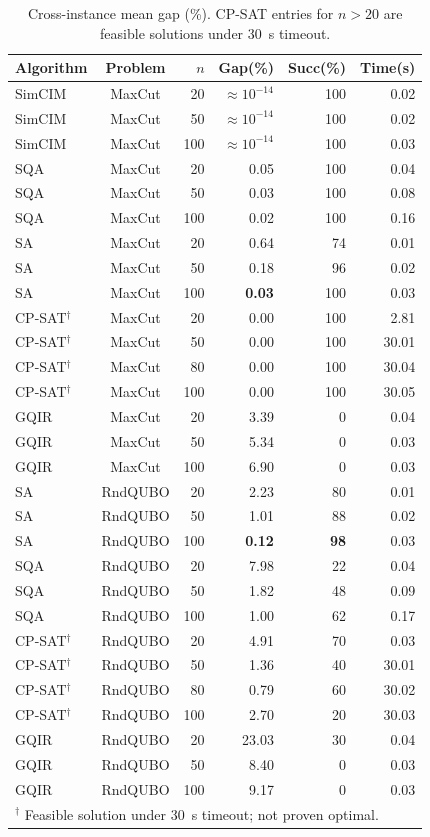 \documentclass[10pt,twocolumn]{article}
\begin{document}
\begin{table}[t]
\centering\small
\caption{Cross-instance mean gap (\%). CP-SAT entries for $n>20$ are feasible solutions under 30~s timeout.}
\label{tab:main}
\begin{tabular}{lcrrrr}
\toprule
Algorithm & Problem & $n$ & Gap(\%) & Succ(\%) & Time(s)\\
\midrule
SimCIM & MaxCut & 20 & $\approx10^{-14}$ & 100 & 0.02\\
SimCIM & MaxCut & 50 & $\approx10^{-14}$ & 100 & 0.02\\
SimCIM & MaxCut & 100 & $\approx10^{-14}$ & 100 & 0.03\\
SQA & MaxCut & 20 & 0.05 & 100 & 0.04\\
SQA & MaxCut & 50 & 0.03 & 100 & 0.08\\
SQA & MaxCut & 100 & 0.02 & 100 & 0.16\\
SA & MaxCut & 20 & 0.64 & 74 & 0.01\\
SA & MaxCut & 50 & 0.18 & 96 & 0.02\\
SA & MaxCut & 100 & \textbf{0.03} & 100 & 0.03\\
CP-SAT$^\dagger$ & MaxCut & 20 & 0.00 & 100 & 2.81\\
CP-SAT$^\dagger$ & MaxCut & 50 & 0.00 & 100 & 30.01\\
CP-SAT$^\dagger$ & MaxCut & 80 & 0.00 & 100 & 30.04\\
CP-SAT$^\dagger$ & MaxCut & 100 & 0.00 & 100 & 30.05\\
GQIR & MaxCut & 20 & 3.39 & 0 & 0.04\\
GQIR & MaxCut & 50 & 5.34 & 0 & 0.03\\
GQIR & MaxCut & 100 & 6.90 & 0 & 0.03\\
\addlinespace
SA & RndQUBO & 20 & 2.23 & 80 & 0.01\\
SA & RndQUBO & 50 & 1.01 & 88 & 0.02\\
SA & RndQUBO & 100 & \textbf{0.12} & \textbf{98} & 0.03\\
SQA & RndQUBO & 20 & 7.98 & 22 & 0.04\\
SQA & RndQUBO & 50 & 1.82 & 48 & 0.09\\
SQA & RndQUBO & 100 & 1.00 & 62 & 0.17\\
CP-SAT$^\dagger$ & RndQUBO & 20 & 4.91 & 70 & 0.03\\
CP-SAT$^\dagger$ & RndQUBO & 50 & 1.36 & 40 & 30.01\\
CP-SAT$^\dagger$ & RndQUBO & 80 & 0.79 & 60 & 30.02\\
CP-SAT$^\dagger$ & RndQUBO & 100 & 2.70 & 20 & 30.03\\
GQIR & RndQUBO & 20 & 23.03 & 30 & 0.04\\
GQIR & RndQUBO & 50 & 8.40 & 0 & 0.03\\
GQIR & RndQUBO & 100 & 9.17 & 0 & 0.03\\
\bottomrule
\multicolumn{6}{l}{\footnotesize $^\dagger$ Feasible solution under 30~s timeout; not proven optimal.}
\end{tabular}
\end{table}
\end{document}
